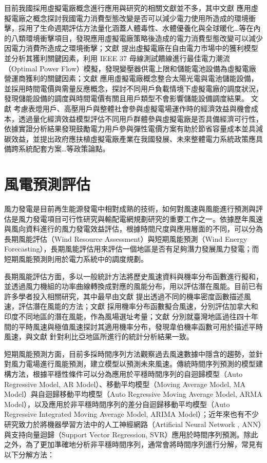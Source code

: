 目前我國採用虛擬電廠概念進行應用與研究的相關文獻並不多，其中文獻 \cite{U0001-2906201000281800} 應用虛擬電廠之概念探討我國電力消費型態改變是否可以減少電力使用所造成的環境衝擊，採用了生命週期評估方法量化涵蓋人體毒性、水體優養化與全球暖化…等在內的八類環境衝擊項目，發現應用虛擬電廠策略後造成的電力消費型態改變可以減少因電力消費所造成之環境衝擊；文獻 \cite{U0027-0212201417510382} 提出虛擬電廠在自由電力市場中的獲利模型並分析其獲利關鍵因素，利用 IEEE 37 母線測試饋線進行最佳電力潮流（Optimal Power Flow）模擬，發現變壓器供電上限和儲能電池設備為虛擬電廠營運商獲利的關鍵因素；文獻 \cite{U0027-2501201611000959} 應用虛擬電廠概念整合太陽光電與電池儲能設備，並採用時間電價與需量反應概念，探討不同用戶負載情境下虛擬電廠的調度狀況，發現儲能設備的調度與時間電價有關且用戶類型不會影響儲能設備調度結果。
文獻 \cite{chung2016vpp} 考慮表燈用戶、高壓用戶與整體社會參與虛擬電場運作時的經濟效益與機會成本，透過量化經濟效益模型評估不同用戶群體參與虛擬電廠是否具備經濟可行性，依據實證分析結果發現鼓勵電力用戶參與彈性電價方案有助於節省容量成本並具減碳效益，並提出政府應扶植虛擬電廠產業在我國發展、未來整體電力系統政策應具備跨系統配套方案…等政策論點。

\section{風電預測評估}

風力發電是目前再生能源發電中相對成熟的技術，如何對風速與風能進行預測與評估是風力發電項目可行性研究與輸配電網規劃研究的重要工作之一。依據歷年風速與風向資料進行的風力發電效益評估，根據時間尺度與應用層面的不同，可以分為長期風能評估（Wind Resource Assessment）與短期風能預測（Wind Energy Forecasting），長期風能評估用來評估一個地區是否有足夠潛力發展風力發電；而短期風能預測則用於電力系統中的調度規劃。

長期風能評估方面，多以一般統計方法將歷史風速資料與機率分布函數進行擬和，並透過風力機組的功率曲線轉換成對應的風能分布，用以評估潛在風能。目前已有許多學者投入相關研究，其中最早由文獻 \cite{justus1976nationwide} 提出透過不同的機率密度函數描述風速，評估潛在風能的方法；文獻 \cite{nigim2007heuristic, panda1990stochastic, kumar2019wind} 採用機率分布函數擬合風速，分別評估加拿大和印度不同地區的潛在風能，作為風場選址考量；文獻 \cite{chuang2001wind} 分別就臺灣地區過往四十年間的平時風速與極值風速探討其適用機率分布，發現韋伯機率函數可用於描述平時風速，與文獻 \cite{teyabeen2015statistical} 針對利比亞地區所進行的統計分析結果一致。

短期風能預測方面，目前多採時間序列方法觀察過去風速數據中隱含的趨勢，並針對風力電場進行風能預測，建立模型以預測未來風速。傳統時間序列預測的模型建構方法，根據平穩性條件可以分為應用於平穩時間序列的自迴歸模型（Auto Regressive Model, AR Model）、移動平均模型（Moving Average Model, MA Model）與自迴歸移動平均模型（Auto Regressive Moving Average Model, ARMA Model），以及應用於非平穩時間序列的差分自迴歸移動平均模型（Auto Regressive Integrated Moving Average Model, ARIMA Model）；近年來也有不少研究致力於將機器學習方法中的人工神經網路（Artificial Neural Network
, ANN）與支持向量迴歸（Support Vector Regression, SVR）應用於時間序列預測。除此之外，為了更加準確地分析非平穩時間序列，通常會將時間序列進行分解，常見有以下分解方法：

